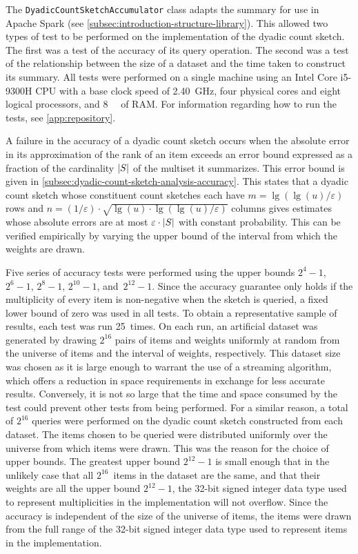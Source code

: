 The \lstinline{DyadicCountSketchAccumulator} class adapts the summary for use in Apache Spark (see \cref{subsec:introduction-structure-library}).
This allowed two types of test to be performed on the implementation of the dyadic count sketch.
The first was a test of the accuracy of its query operation.
The second was a test of the relationship between the size of a dataset and the time taken to construct its summary.
All tests were performed on a single machine using an Intel Core i5-9300H CPU with a base clock speed of \SI{2.40}{\giga\hertz}, four physical cores and eight logical processors, and \SI{8}{\gibi\byte} of RAM\@.
For information regarding how to run the tests, see \cref{app:repository}.

A failure in the accuracy of a dyadic count sketch occurs when the absolute error in its approximation of the rank of an item exceeds an error bound expressed as a fraction of the cardinality \( \lvert S\rvert \) of the multiset it summarizes.
This error bound is given in \cref{subsec:dyadic-count-sketch-analysis-accuracy}.
This states that a dyadic count sketch whose constituent count sketches each have \( m = \lg (\lg (u) / \varepsilon) \) rows and \( n = (1 / \varepsilon) \cdot \sqrt{\lg (u) \cdot \lg (\lg (u) / \varepsilon)} \) columns gives estimates whose absolute errors are at most \( \varepsilon \cdot \lvert S\rvert \) with constant probability.
This can be verified empirically by varying the upper bound of the interval from which the weights are drawn.

Five series of accuracy tests were performed using the upper bounds \( 2^{4} - 1 \), \( 2^{6} - 1 \), \( 2^{8} - 1 \), \( 2^{10} - 1 \), and~\( 2^{12} - 1 \).
Since the accuracy guarantee only holds if the multiplicity of every item is non-negative when the sketch is queried, a fixed lower bound of zero was used in all tests.
To obtain a representative sample of results, each test was run \num{25}~times.
On each run, an artificial dataset was generated by drawing \( 2^{16} \) pairs of items and weights uniformly at random from the universe of items and the interval of weights, respectively.
This dataset size was chosen as it is large enough to warrant the use of a streaming algorithm, which offers a reduction in space requirements in exchange for less accurate results.
Conversely, it is not so large that the time and space consumed by the test could prevent other tests from being performed.
For a similar reason, a total of \( 2^{16} \) queries were performed on the dyadic count sketch constructed from each dataset.
The items chosen to be queried were distributed uniformly over the universe from which items were drawn.
This was the reason for the choice of upper bounds.
The greatest upper bound \( 2^{12} - 1 \) is small enough that in the unlikely case that all \( 2^{16} \)~items in the dataset are the same, and that their weights are all the upper bound \( 2^{12} - 1 \), the \num{32}-bit signed integer data type used to represent multiplicities in the implementation will not overflow.
Since the accuracy is independent of the size of the universe of items, the items were drawn from the full range of the \num{32}-bit signed integer data type used to represent items in the implementation.

